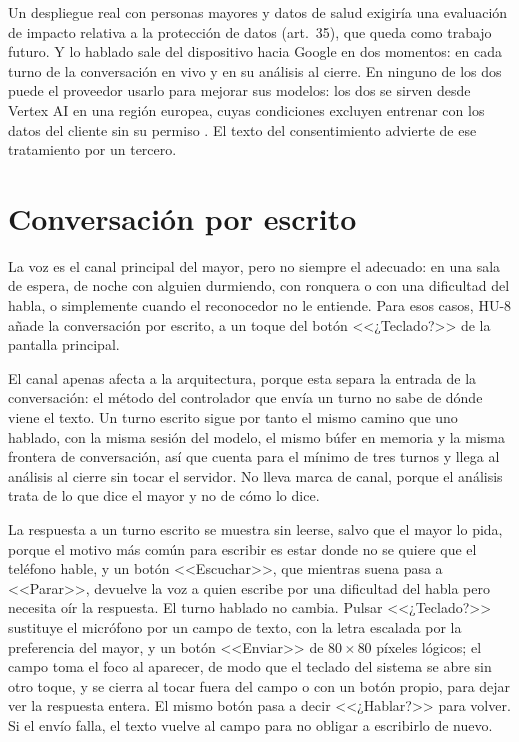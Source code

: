 Un despliegue real con personas mayores y datos de salud exigiría una evaluación de impacto relativa a la protección de datos (art.~35), que queda como trabajo futuro. Y lo hablado sale del dispositivo hacia Google en dos momentos: en cada turno de la conversación en vivo y en su análisis al cierre. En ninguno de los dos puede el proveedor usarlo para mejorar sus modelos: los dos se sirven desde Vertex AI en una región europea, cuyas condiciones excluyen entrenar con los datos del cliente sin su permiso \citep{VertexDataGovernance}. El texto del consentimiento advierte de ese tratamiento por un tercero.

\section{Conversación por escrito}
\label{sec:teclado}

La voz es el canal principal del mayor, pero no siempre el adecuado: en una sala de espera, de noche con alguien durmiendo, con ronquera o con una dificultad del habla, o simplemente cuando el reconocedor no le entiende. Para esos casos, HU-8 añade la conversación por escrito, a un toque del botón <<¿Teclado?>> de la pantalla principal.

El canal apenas afecta a la arquitectura, porque esta separa la entrada de la conversación: el método del controlador que envía un turno no sabe de dónde viene el texto. Un turno escrito sigue por tanto el mismo camino que uno hablado, con la misma sesión del modelo, el mismo búfer en memoria y la misma frontera de conversación, así que cuenta para el mínimo de tres turnos y llega al análisis al cierre sin tocar el servidor. No lleva marca de canal, porque el análisis trata de lo que dice el mayor y no de cómo lo dice.

La respuesta a un turno escrito se muestra sin leerse, salvo que el mayor lo pida, porque el motivo más común para escribir es estar donde no se quiere que el teléfono hable, y un botón <<Escuchar>>, que mientras suena pasa a <<Parar>>, devuelve la voz a quien escribe por una dificultad del habla pero necesita oír la respuesta. El turno hablado no cambia. Pulsar <<¿Teclado?>> sustituye el micrófono por un campo de texto, con la letra escalada por la preferencia del mayor, y un botón <<Enviar>> de $80\times80$ píxeles lógicos; el campo toma el foco al aparecer, de modo que el teclado del sistema se abre sin otro toque, y se cierra al tocar fuera del campo o con un botón propio, para dejar ver la respuesta entera. El mismo botón pasa a decir <<¿Hablar?>> para volver. Si el envío falla, el texto vuelve al campo para no obligar a escribirlo de nuevo.

